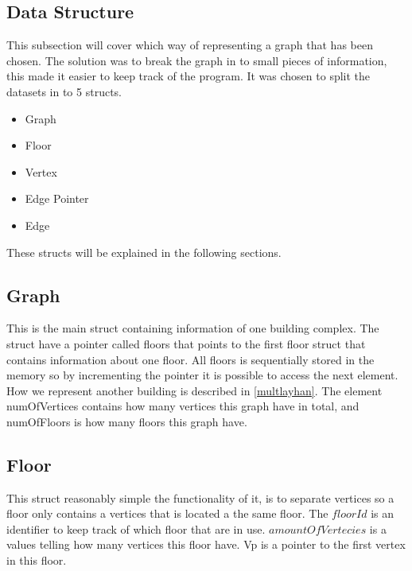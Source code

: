 
\subsection{Data Structure}
\label{sub:data_structure}

This subsection will cover which way of representing a graph that has been chosen. The solution was to break the graph in to small pieces of information, this made it easier to keep track of the program. It was chosen to split the datasets in to 5 structs.
\begin{minipage}{\linewidth}
\begin{itemize} [noitemsep]
	\item Graph
	\item Floor
	\item Vertex
	\item Edge Pointer
	\item Edge
\end{itemize}
\end{minipage}

These structs will be explained in the following sections. 

\begin{minipage}{\linewidth}
\subsection{Graph} 
This is the main struct containing information of one building complex.
The struct have a pointer called floors that points to the first floor struct that contains information about one floor. All floors is sequentially stored in the memory so by incrementing the pointer it is possible to access the next element. How we represent another building is described in \cref{multlayhan}. The element numOfVertices contains how many vertices this graph have in total, and numOfFloors is how many floors this graph have.


 \label{Graph_struct}
\end{minipage}

\begin{minipage}{\linewidth}
\subsection{Floor} \label{subsub:floor}
This struct reasonably simple the functionality of it, is to separate vertices so a floor only contains a vertices that is located a the same floor. The $floorId$ is an identifier to keep track of which floor that are in use.
$amountOfVertecies$ is a values telling how many vertices this floor have. Vp is a pointer to the first vertex in this floor.

 \label{Floor_struct}
\end{minipage}

